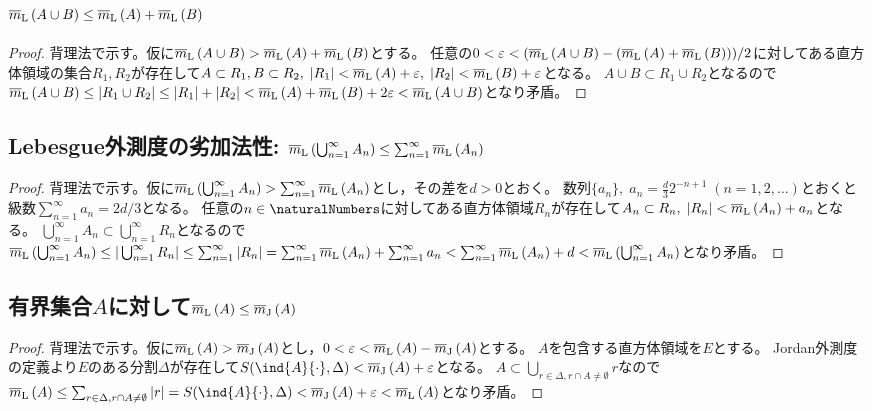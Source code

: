         \subsection{\texorpdfstring{$\mLebO{A\cup B}\leq\mLebO{A} + \mLebO{B}$}{mLo(A∪B)≦mLo(A)+mLo(B)}}
            \begin{proof}
                \quad\par
                背理法で示す。仮に$\mLebO{A\cup B} > \mLebO{A} + \mLebO{B}$とする。
                任意の$0 < \varepsilon < (\mLebO{A\cup B} - (\mLebO{A} + \mLebO{B}))/2$に対してある直方体領域の集合$R_1,R_2$が存在して$A\subset R_1, B\subset R_2,\;|R_1|<\mLebO{A} + \varepsilon,\;|R_2| < \mLebO{B} + \varepsilon$となる。
                $A\cup B \subset R_1\cup R_2$となるので$\mLebO{A\cup B} \leq |R_1\cup R_2| \leq |R_1|+|R_2| < \mLebO{A} + \mLebO{B} + 2\varepsilon < \mLebO{A\cup B}$となり矛盾。
            \end{proof}
        \subsection{Lebesgue外測度の劣加法性: \texorpdfstring{$\mLebO{\bigcup_{n=1}^\infty A_n} \leq \sum_{n=1}^\infty \mLebO{A_n}$}{}}
            \begin{proof}
                \quad\par
                背理法で示す。仮に$\mLebO{\bigcup_{n=1}^\infty A_n} > \sum_{n=1}^\infty \mLebO{A_n}$とし，その差を$d>0$とおく。
                数列$\{a_n\},\;a_n = \frac{d}{3}2^{-n+1}\;(n=1,2,\dotsc)$とおくと級数$\sum_{n=1}^\infty a_n = 2d/3$となる。
                任意の$n\in\naturalNumbers$に対してある直方体領域$R_n$が存在して$A_n\subset R_n,\;|R_n| < \mLebO{A_n} + a_n$となる。
                $\bigcup_{n=1}^\infty A_n \subset \bigcup_{n=1}^\infty R_n$となるので$\mLebO{\bigcup_{n=1}^\infty A_n} \leq |\bigcup_{n=1}^\infty R_n| \leq \sum_{n=1}^\infty |R_n| = \sum_{n=1}^\infty \mLebO{A_n} + \sum_{n=1}^\infty a_n < \sum_{n=1}^\infty \mLebO{A_n} + d < \mLebO{\bigcup_{n=1}^\infty A_n}$となり矛盾。
            \end{proof}
        \subsection{有界集合\texorpdfstring{$A$}{A}に対して\texorpdfstring{$\mLebO{A}\leq\mJo{A}$}{Lebesgue外測度≦Jordan外測度}}
            \label{subsec: Lebesgue外測度≦Jordan外測度}
            \begin{proof}
                \quad\par
                背理法で示す。仮に$\mLebO{A} > \mJo{A}$とし，$0<\varepsilon<\mLebO{A} - \mJo{A}$とする。
                $A$を包含する直方体領域を$E$とする。
                Jordan外測度の定義より$E$のある分割$\Delta$が存在して$S(\ind{A}{\cdot},\Delta) < \mJo{A} + \varepsilon$となる。
                $A \subset \bigcup_{r\in\Delta,r\cap A\neq\emptyset}r$なので$\mLebO{A} \leq \sum_{r\in\Delta,r\cap A\neq\emptyset}|r| = S(\ind{A}{\cdot},\Delta) < \mJo{A} + \varepsilon < \mLebO{A}$となり矛盾。
            \end{proof}
